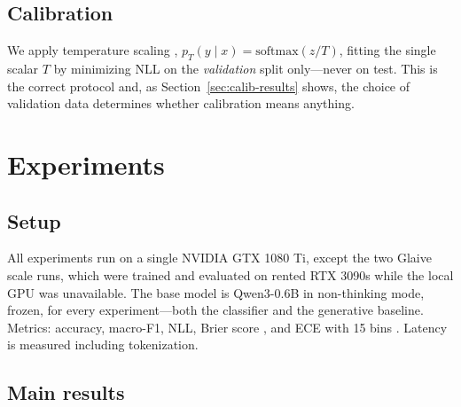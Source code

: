 \documentclass{article}
\begin{document}
\subsection{Calibration}
\label{sec:calib-method}

We apply temperature scaling \citep{guo2017calibration},
$p_T(y \mid x) = \mathrm{softmax}(z / T)$, fitting the single scalar $T$ by
minimizing NLL on the \emph{validation} split only---never on test. This is
the correct protocol and, as Section~\ref{sec:calib-results} shows, the
choice of validation data determines whether calibration means anything.

\section{Experiments}
\label{sec:experiments}

\subsection{Setup}
\label{sec:setup}

All experiments run on a single NVIDIA GTX 1080 Ti, except the two Glaive
scale runs, which were trained and evaluated on rented RTX 3090s while the
local GPU was unavailable. The base model is Qwen3-0.6B
in non-thinking mode, frozen, for every experiment---both the classifier and
the generative baseline. Metrics: accuracy,
macro-F1, NLL, Brier score \citep{brier1950verification}, and ECE with 15
bins \citep{naeini2015obtaining}. Latency is measured including tokenization.

\subsection{Main results}
\label{sec:results}
\end{document}
